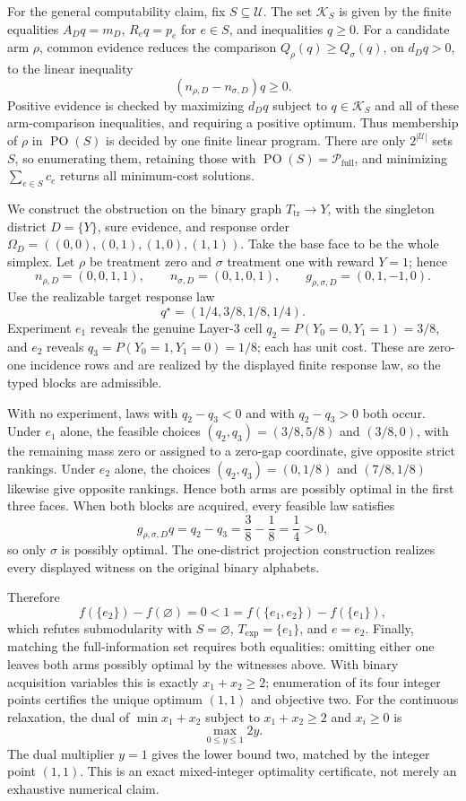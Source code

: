 For the general computability claim, fix \(S\subseteq\mathcal U\).  The set \(\mathcal K_S\) is given by the finite equalities \(A_Dq=m_D\), \(R_eq=p_e\) for \(e\in S\), and inequalities \(q\geq0\).  For a candidate arm \(\rho\), common evidence reduces the comparison \(Q_\rho(q)\geq Q_\sigma(q)\), on \(d_Dq>0\), to the linear inequality
\[
 (n_{\rho,D}-n_{\sigma,D})q\geq0.
\]
Positive evidence is checked by maximizing \(d_Dq\) subject to \(q\in\mathcal K_S\) and all of these arm-comparison inequalities, and requiring a positive optimum.  Thus membership of \(\rho\) in \(\operatorname{PO}(S)\) is decided by one finite linear program.  There are only \(2^{|\mathcal U|}\) sets \(S\), so enumerating them, retaining those with \(\operatorname{PO}(S)=\mathcal P_{\mathrm{full}}\), and minimizing \(\sum_{e\in S}c_e\) returns all minimum-cost solutions.

We construct the obstruction on the binary graph \(T_{\mathrm{tr}}\to Y\), with the singleton district \(D=\{Y\}\), sure evidence, and response order
\(
 \Omega_D=((0,0),(0,1),(1,0),(1,1)).
\)
Take the base face to be the whole simplex.  Let \(\rho\) be treatment zero and \(\sigma\) treatment one with reward \(Y=1\); hence
\[
 n_{\rho,D}=(0,0,1,1),
 \qquad n_{\sigma,D}=(0,1,0,1),
 \qquad g_{\rho,\sigma,D}=(0,1,-1,0).
\]
Use the realizable target response law
\[
 q^\star=(1/4,3/8,1/8,1/4).
\]
Experiment \(e_1\) reveals the genuine Layer-3 cell
\(
 q_2=P(Y_0=0,Y_1=1)=3/8
\), and \(e_2\) reveals
\(
 q_3=P(Y_0=1,Y_1=0)=1/8
\); each has unit cost.  These are zero-one incidence rows and are realized by the displayed finite response law, so the typed blocks are admissible.

With no experiment, laws with \(q_2-q_3<0\) and with \(q_2-q_3>0\) both occur.  Under \(e_1\) alone, the feasible choices \((q_2,q_3)=(3/8,5/8)\) and \((3/8,0)\), with the remaining mass zero or assigned to a zero-gap coordinate, give opposite strict rankings.  Under \(e_2\) alone, the choices \((q_2,q_3)=(0,1/8)\) and \((7/8,1/8)\) likewise give opposite rankings.  Hence both arms are possibly optimal in the first three faces.  When both blocks are acquired, every feasible law satisfies
\[
 g_{\rho,\sigma,D}q=q_2-q_3=\frac38-\frac18=\frac14>0,
\]
so only \(\sigma\) is possibly optimal.  The one-district projection construction realizes every displayed witness on the original binary alphabets.

Therefore
\[
 f(\{e_2\})-f(\varnothing)=0
 <1=f(\{e_1,e_2\})-f(\{e_1\}),
\]
which refutes submodularity with \(S=\varnothing\), \(T_{\mathrm{exp}}=\{e_1\}\), and \(e=e_2\).  Finally, matching the full-information set requires both equalities: omitting either one leaves both arms possibly optimal by the witnesses above.  With binary acquisition variables this is exactly \(x_1+x_2\geq2\); enumeration of its four integer points certifies the unique optimum \((1,1)\) and objective two.
For the continuous relaxation, the dual of \(\min x_1+x_2\) subject to \(x_1+x_2\geq2\) and \(x_i\geq0\) is
\[
 \max_{0\leq y\leq1}2y.
\]
The dual multiplier \(y=1\) gives the lower bound two, matched by the integer point \((1,1)\).  This is an exact mixed-integer optimality certificate, not merely an exhaustive numerical claim.
